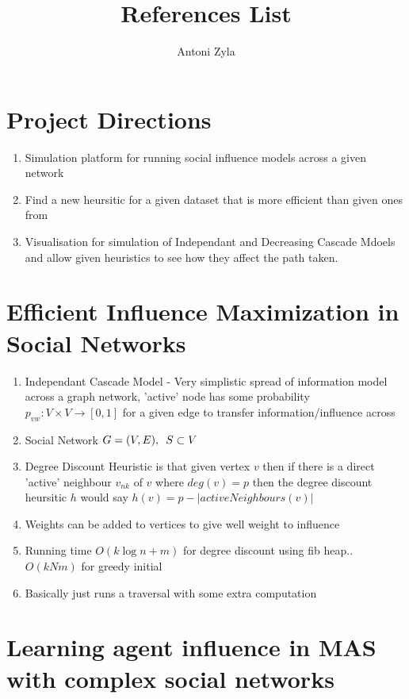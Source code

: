 \documentclass{article}
\title{References List}
\author{Antoni Zyla}
\begin{document}
\maketitle

\section{Project Directions}

\begin{enumerate}
  \item Simulation platform for running social influence models across a given network
  \item Find a new heursitic for a given dataset that is more efficient than given ones from \cite{franks2014learning}
  \item Visualisation for simulation of Independant and Decreasing Cascade Mdoels and allow given heuristics to see how they affect the path taken.
\end{enumerate}


\section{Efficient Influence Maximization in Social Networks}
\cite{chen2009efficient}

\begin{enumerate}
    \item Independant Cascade Model - Very simplistic spread of information model across a graph network, 'active' node has some probability $p_{vw}:V \times V \to [0,1]$ for a given edge to transfer information/influence across
    \item  Social Network $G=(V,E), \hspace{0.5em}S \subset V$
    \item Degree Discount Heuristic is that given vertex $v$ then if there is a direct 'active' neighbour $v_{nk}$ of $v$ where $deg(v) = p$ then the degree discount heursitic $h$ would say $h(v) = p - |activeNeighbours(v)|$
    \item Weights can be added to vertices to give well weight to influence
    \item Running time $O(k\log n + m)$ for degree discount using fib heap.. $O(kNm)$ for greedy initial
    \item Basically just runs a traversal with some extra computation
\end{enumerate}

\section{Learning agent influence in MAS with complex
  social networks}
\cite{franks2014learning}
\end{document}
